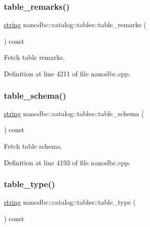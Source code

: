 \subsubsection{\texorpdfstring{table\_remarks()}{table\_remarks()}}
{\footnotesize\ttfamily \mbox{\hyperlink{namespacenanodbc_abfc0ece56278e590911ec8352774c212}{string}} nanodbc\+::catalog\+::tables\+::table\+\_\+remarks (\begin{DoxyParamCaption}{ }\end{DoxyParamCaption}) const}



Fetch table remarks. 



Definition at line 4211 of file nanodbc.\+cpp.

\mbox{\label{classnanodbc_1_1catalog_1_1tables_af38adabf52d3dc10178704c5f5a551d3}} 
\subsubsection{\texorpdfstring{table\_schema()}{table\_schema()}}
{\footnotesize\ttfamily \mbox{\hyperlink{namespacenanodbc_abfc0ece56278e590911ec8352774c212}{string}} nanodbc\+::catalog\+::tables\+::table\+\_\+schema (\begin{DoxyParamCaption}{ }\end{DoxyParamCaption}) const}



Fetch table schema. 



Definition at line 4193 of file nanodbc.\+cpp.

\mbox{\label{classnanodbc_1_1catalog_1_1tables_adb13cff21e59c6f534ee426d5b35ddd0}} 
\subsubsection{\texorpdfstring{table\_type()}{table\_type()}}
{\footnotesize\ttfamily \mbox{\hyperlink{namespacenanodbc_abfc0ece56278e590911ec8352774c212}{string}} nanodbc\+::catalog\+::tables\+::table\+\_\+type (\begin{DoxyParamCaption}{ }\end{DoxyParamCaption}) const}




